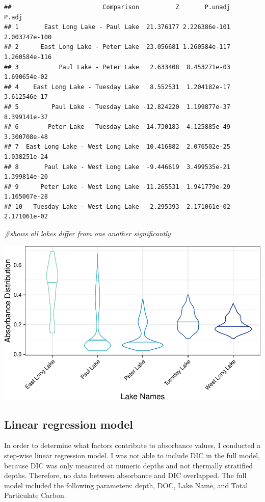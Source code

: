 \documentclass[12pt,]{article}
\newenvironment{Shaded}{\begin{snugshade}}{\end{snugshade}}
\newcommand{\CommentTok}[1]{\textcolor[rgb]{0.56,0.35,0.01}{\textit{#1}}}
\begin{document}
\begin{verbatim}
##                         Comparison          Z       P.unadj         P.adj
## 1       East Long Lake - Paul Lake  21.376177 2.226386e-101 2.003747e-100
## 2      East Long Lake - Peter Lake  23.056681 1.260584e-117 1.260584e-116
## 3           Paul Lake - Peter Lake   2.633408  8.453271e-03  1.690654e-02
## 4    East Long Lake - Tuesday Lake   8.552531  1.204182e-17  3.612546e-17
## 5         Paul Lake - Tuesday Lake -12.824220  1.199877e-37  8.399141e-37
## 6        Peter Lake - Tuesday Lake -14.730183  4.125885e-49  3.300708e-48
## 7  East Long Lake - West Long Lake  10.416882  2.076502e-25  1.038251e-24
## 8       Paul Lake - West Long Lake  -9.446619  3.499535e-21  1.399814e-20
## 9      Peter Lake - West Long Lake -11.265531  1.941779e-29  1.165067e-28
## 10   Tuesday Lake - West Long Lake   2.295393  2.171061e-02  2.171061e-02
\end{verbatim}

\begin{Shaded}
\begin{Highlighting}[]
\CommentTok{#shows all lakes differ from one another significantly }
\end{Highlighting}
\end{Shaded}

\includegraphics{Bash_ENV872_Project_files/figure-latex/violin-1.pdf}
\newpage

\subsection{Linear regression model}\label{linear-regression-model}

In order to determine what factors contribute to absorbance values, I
conducted a step-wise linear regression model. I was not able to include
DIC in the full model, because DIC was only measured at numeric depths
and not thermally stratified depths. Therefore, no data between
absorbance and DIC overlapped. The full model included the following
parameters: depth, DOC, Lake Name, and Total Particulate Carbon.
\end{document}
